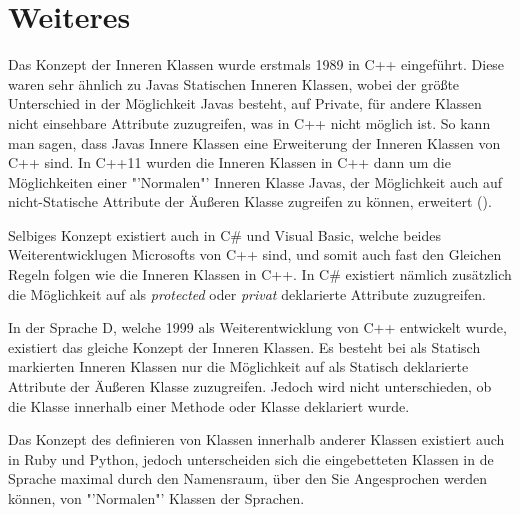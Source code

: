\section{Weiteres}

Das Konzept der Inneren Klassen wurde erstmals 1989 in C++ eingeführt.
Diese waren sehr ähnlich zu Javas Statischen Inneren Klassen, wobei der größte Unterschied in der Möglichkeit Javas besteht, auf Private, für andere Klassen nicht einsehbare Attribute zuzugreifen, was in C++ nicht möglich ist.
So kann man sagen, dass Javas Innere Klassen eine Erweiterung der Inneren Klassen von C++ sind.
In C++11 wurden die Inneren Klassen in C++ dann um die Möglichkeiten einer "'Normalen"' Inneren Klasse Javas, der Möglichkeit auch auf nicht-Statische Attribute der Äußeren Klasse zugreifen zu können, erweitert (\cite{Ellis2007}).

Selbiges Konzept existiert auch in C\# und Visual Basic, welche beides Weiterentwicklugen Microsofts von C++ sind,
 und somit auch fast den Gleichen Regeln folgen wie die Inneren Klassen in C++.
In C\# existiert nämlich zusätzlich die Möglichkeit auf als {\it protected} oder {\it privat} deklarierte Attribute zuzugreifen.

In der Sprache D, welche 1999 als Weiterentwicklung von C++ entwickelt wurde, existiert das gleiche Konzept der Inneren Klassen.
Es besteht bei als Statisch markierten Inneren Klassen nur die Möglichkeit auf als Statisch deklarierte Attribute der Äußeren Klasse zuzugreifen.
Jedoch wird nicht unterschieden, ob die Klasse innerhalb einer Methode oder Klasse deklariert wurde.

Das Konzept des definieren von Klassen innerhalb anderer Klassen existiert auch in Ruby und Python,
 jedoch unterscheiden sich die eingebetteten Klassen in de Sprache maximal durch den Namensraum,
 über den Sie Angesprochen werden können, von "'Normalen"' Klassen der Sprachen.
